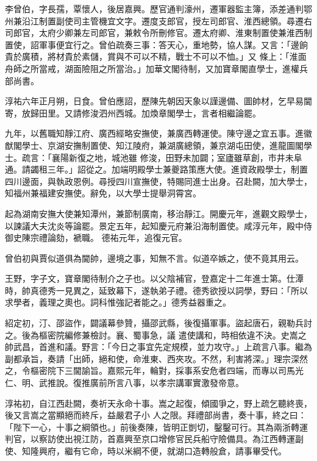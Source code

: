 \begin{pinyinscope}
 李曾伯，字長孺，覃懷人，後居嘉興。歷官通判濠州，遷軍器監主簿，添差通判鄂州兼沿江制置副使司主管機宜文字。遷度支郎官，授左司郎官、淮西總領。尋遷右司郎官，太府少卿兼左司郎官，兼敕令所刪修官。遷太府卿、淮東制置使兼淮西制置使，詔軍事便宜行之。曾伯疏奏三事：答天心，重地勢，協人謀。又言：「邊餉貴於廣積，將材貴於素儲，賞與不可以不精，戰士不可以不恤。」又
 條上：「淮面舟師之所當戒，湖面險阻之所當治。」加華文閣待制，又加寶章閣直學士，進權兵部尚書。



 淳祐六年正月朔，日食。曾伯應詔，歷陳先朝因天象以謹邊備、圖帥材，乞早易閫寄，放歸田里。又請修浚泗州西城。加煥章閣學士，言者相繼論罷。



 九年，以舊職知靜江府、廣西經略安撫使，兼廣西轉運使。陳守邊之宜五事。進徽猷閣學士、京湖安撫制置使、知江陵府，兼湖廣總領，兼京湖屯田使，進龍圖閣學士。疏言：「襄陽新復之地，城池雖
 修浚，田野未加闢；室廬雖草創，市井未阜通。請蠲租三年。」詔從之。加端明殿學士兼夔路策應大使。進資政殿學士，制置四川邊面，與執政恩例。尋授四川宣撫使，特賜同進士出身。召赴闕，加大學士，知福州兼福建安撫使。辭免，以大學士提舉洞霄宮。



 起為湖南安撫大使兼知潭州，兼節制廣南，移治靜江。開慶元年，進觀文殿學士，以諫議大夫沈炎等論罷。景定五年，起知慶元府兼沿海制置使。咸淳元年，殿中侍御史陳宗禮論劾，褫職。
 德祐元年，追復元官。



 曾伯初與賈似道俱為閫帥，邊境之事，知無不言。似道卒嫉之，使不竟其用云。



 王野，字子文，寶章閣待制介之子也。以父陰補官，登嘉定十二年進士第。仕潭時，帥真德秀一見異之，延致幕下，遂執弟子禮。德秀欲授以詞學，野曰：「所以求學者，義理之奧也。詞科惟強記者能之。」德秀益器重之。



 紹定初，汀、邵盜作，闢議幕參贊，攝邵武縣，後復攝軍事。盜起唐石，親勒兵討之。後為樞密院編修兼檢討。襄、蜀事急，議
 遣使講和，時相依違不決。史嵩之帥武昌，首進和議。野言：「今日之事宜先定規模，並力攻守。」上疏言八事。繼為副都承旨，奏請「出師，絕和使，命淮東、西夾攻。不然，利害將深。」理宗深然之，令樞密院下三閫諭旨。嘉熙元年，輪對，採事系安危者四端，而專以司馬光仁、明、武推說。復推廣前所言八事，以孝宗講軍實激發帝意。



 淳祐初，自江西赴闕，奏祈天永命十事。嵩之起復，傾國爭之，野上疏乞聽終喪，後又言嵩之當顯絕而終斥，益嚴君子小
 人之限。拜禮部尚書，奏十事，終之曰：「陛下一心，十事之綱領也。」前後奏陳，皆明正剴切，鑿鑿可行。其為兩浙轉運判官，以察訪使出視江防，首嘉興至京口增修官民兵船守險備具。為江西轉運副使、知隆興府，繼有它命，時以米綱不便，就湖口造轉般倉，請事畢受代。




\end{pinyinscope}
